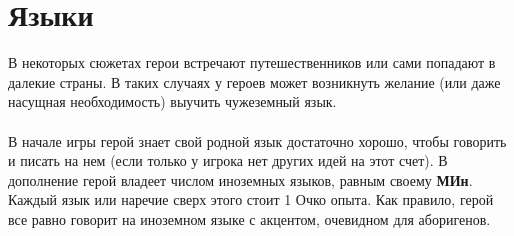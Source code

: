 \section{Языки}
В некоторых сюжетах герои встречают путешественников или сами попадают в далекие страны. В таких случаях у героев может возникнуть желание (или даже насущная необходимость) выучить чужеземный язык.
\paragraph{}
В начале игры герой знает свой родной язык достаточно хорошо, чтобы говорить и писать на нем (если только у игрока нет других идей на этот счет). В дополнение герой владеет числом иноземных языков, равным своему \textbf{МИн}. Каждый язык или наречие сверх этого стоит 1 Очко опыта. Как правило, герой все равно говорит на иноземном языке с акцентом, очевидном для аборигенов.